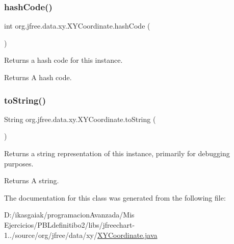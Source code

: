 \subsubsection{\texorpdfstring{hash\+Code()}{hashCode()}}
{\footnotesize\ttfamily int org.\+jfree.\+data.\+xy.\+X\+Y\+Coordinate.\+hash\+Code (\begin{DoxyParamCaption}{ }\end{DoxyParamCaption})}

Returns a hash code for this instance.

\begin{DoxyReturn}{Returns}
A hash code. 
\end{DoxyReturn}
\mbox{\label{classorg_1_1jfree_1_1data_1_1xy_1_1_x_y_coordinate_a2f33a3dd4e8228019080f6f124162c88}} 
\subsubsection{\texorpdfstring{to\+String()}{toString()}}
{\footnotesize\ttfamily String org.\+jfree.\+data.\+xy.\+X\+Y\+Coordinate.\+to\+String (\begin{DoxyParamCaption}{ }\end{DoxyParamCaption})}

Returns a string representation of this instance, primarily for debugging purposes.

\begin{DoxyReturn}{Returns}
A string. 
\end{DoxyReturn}


The documentation for this class was generated from the following file\+:\begin{DoxyCompactItemize}
\item 
D\+:/ikasgaiak/programacion\+Avanzada/\+Mis Ejercicios/\+P\+B\+Ldefinitibo2/libs/jfreechart-\/1../source/org/jfree/data/xy/\mbox{\hyperlink{_x_y_coordinate_8java}{X\+Y\+Coordinate.\+java}}\end{DoxyCompactItemize}
